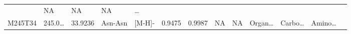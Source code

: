 \documentclass[
]{article}
\begin{document}
\begin{longtable}[]{@{}lllllllllllll@{}}
\begin{minipage}[t]{0.04\columnwidth}
\end{minipage} & \begin{minipage}[t]{0.05\columnwidth}\raggedright
NA\strut
\end{minipage} & \begin{minipage}[t]{0.05\columnwidth}\raggedright
NA\strut
\end{minipage} & \begin{minipage}[t]{0.05\columnwidth}\raggedright
NA\strut
\end{minipage} & \begin{minipage}[t]{0.02\columnwidth}\raggedright
\ldots{}\strut
\end{minipage}\tabularnewline
\begin{minipage}[t]{0.05\columnwidth}\raggedright
M245T34\strut
\end{minipage} & \begin{minipage}[t]{0.05\columnwidth}\raggedright
245.0\ldots{}\strut
\end{minipage} & \begin{minipage}[t]{0.05\columnwidth}\raggedright
33.9236\strut
\end{minipage} & \begin{minipage}[t]{0.05\columnwidth}\raggedright
Asn-Asn\strut
\end{minipage} & \begin{minipage}[t]{0.05\columnwidth}\raggedright
{[}M-H{]}-\strut
\end{minipage} & \begin{minipage}[t]{0.07\columnwidth}\raggedright
0.9475\strut
\end{minipage} & \begin{minipage}[t]{0.07\columnwidth}\raggedright
0.9987\strut
\end{minipage} & \begin{minipage}[t]{0.05\columnwidth}\raggedright
NA\strut
\end{minipage} & \begin{minipage}[t]{0.04\columnwidth}\raggedright
NA\strut
\end{minipage} & \begin{minipage}[t]{0.05\columnwidth}\raggedright
Organ\ldots{}\strut
\end{minipage} & \begin{minipage}[t]{0.05\columnwidth}\raggedright
Carbo\ldots{}\strut
\end{minipage} & \begin{minipage}[t]{0.05\columnwidth}\raggedright
Amino\ldots{}\strut
\end{minipage} & \begin{minipage}[t]{0.02\columnwidth}\raggedright

\end{minipage}
\end{longtable}
\end{document}
